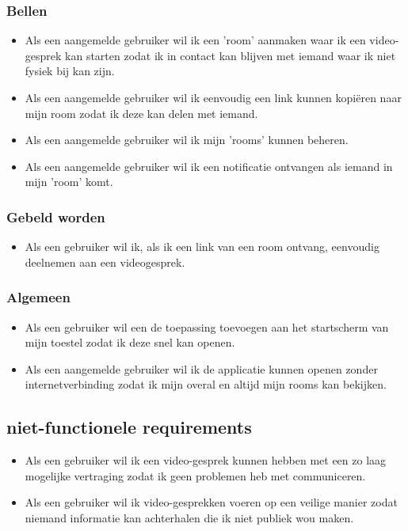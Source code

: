 	 \subsubsection{Bellen}
		  \begin{itemize}
		   	\item Als een aangemelde gebruiker wil ik een 'room' aanmaken waar ik een video-gesprek kan starten zodat ik in contact kan blijven met iemand waar ik niet fysiek bij kan zijn.
		   	\item Als een aangemelde gebruiker wil ik eenvoudig een link kunnen kopiëren naar mijn room zodat ik deze kan delen met iemand.
		   	\item Als een aangemelde gebruiker wil ik mijn 'rooms' kunnen beheren.
		   	\item Als een aangemelde gebruiker wil ik een notificatie ontvangen als iemand in mijn 'room' komt.
		  \end{itemize}
 	
 	\subsubsection{Gebeld worden}
 	 \begin{itemize}
			\item Als een gebruiker wil ik, als ik een link van een room ontvang, eenvoudig deelnemen aan een videogesprek.
 	 \end{itemize}

	\subsubsection{Algemeen}
 		\begin{itemize}
 			\item Als een gebruiker wil een de toepassing toevoegen aan het startscherm van mijn toestel zodat ik deze snel kan openen.
 			\item Als een aangemelde gebruiker wil ik de applicatie kunnen openen zonder internetverbinding zodat ik mijn overal en altijd mijn rooms kan bekijken.
		  
		\end{itemize}
 
	\subsection{niet-functionele requirements}
		\begin{itemize}
			\item Als een gebruiker wil ik een video-gesprek kunnen hebben met een zo laag mogelijke vertraging zodat ik geen problemen heb met communiceren.
			\item Als een gebruiker wil ik video-gesprekken voeren op een veilige manier zodat niemand informatie kan achterhalen die ik niet publiek wou maken.
		\end{itemize} 
		
